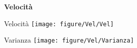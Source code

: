 \documentclass[beamer]{standalone}
\begin{document}
	\begin{frame}
		\color{blue}\centering\Huge{\textbf{Velocità}}	
	\end{frame}
	
	\begin{frame}{{Velocità}}
		\centering\texttt{[image: figure/Vel/Vel]}
	\end{frame}
	
	
	
	\begin{frame}{{Varianza}}
		\centering\texttt{[image: figure/Vel/Varianza]}
	\end{frame}
	
	
	
	
	
	
	
	
\end{document}
